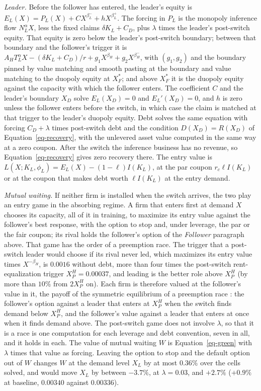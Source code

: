 \documentclass[
  11pt,
  letterpaper,
]{scrartcl}
\begin{document}
\emph{Leader.} Before the follower has entered, the leader's equity is
\(E_L(X) = P_L(X) + C X^{\beta_L^-} + h X^{\beta_L^+}\). The forcing in
\(P_L\) is the monopoly inference flow \(N_L^\alpha X\), less the fixed
claims \(\delta K_L + C_D\), plus \(\lambda\) times the leader's
post-switch equity. That equity is zero below the leader's post-switch
boundary; between that boundary and the follower's trigger it is
\(A_H T_L^\alpha X - (\delta K_L + C_D)/r + g_1 X^{\beta_H} + g_2 X^{\beta_H^-}\),
with \((g_1, g_2)\) and the boundary pinned by value matching and smooth
pasting at the boundary and value matching to the duopoly equity at
\(X_F^*\); and above \(X_F^*\) it is the duopoly equity against the
capacity with which the follower enters. The coefficient \(C\) and the
leader's boundary \(X_D\) solve \(E_L(X_D) = 0\) and \(E_L'(X_D) = 0\),
and \(h\) is zero unless the follower enters before the switch, in which
case the claim is matched at that trigger to the leader's duopoly
equity. Debt solves the same equation with forcing \(C_D + \lambda\)
times post-switch debt and the condition \(D(X_D) = R(X_D)\) of
Equation~\ref{eq-recovery}, with the unlevered asset value computed in
the same way at a zero coupon. After the switch the inference business
has no revenue, so Equation~\ref{eq-recovery} gives zero recovery there.
The entry value is \(L(X; K_L, \phi_L) = E_L(X) - (1-\ell)I(K_L)\), at
the par coupon \(r_c\ell I(K_L)\) or at the coupon that makes debt worth
\(\ell I(K_L)\) at the entry demand.

\emph{Mutual waiting.} If neither firm is installed when the switch
arrives, the two play an entry game in the absorbing regime. A firm that
enters first at demand \(X\) chooses its capacity, all of it in
training, to maximize its entry value against the follower's best
response, with the option to stop and, under leverage, the par or the
fair coupon; its rival holds the follower's option of the
\emph{Follower} paragraph above. That game has the order of a preemption
race. The trigger that a post-switch leader would choose if its rival
never led, which maximizes its entry value times \(X^{-\beta_H}\), is
\(0.0016\) without debt, more than four times the post-switch
rent-equalization trigger \(X_P^H = 0.00037\), and leading is the better
role above \(X_P^H\) (by more than \(10\%\) from \(2X_P^H\) on). Each
firm is therefore valued at the follower's value in it, the payoff of
the symmetric equilibrium of a preemption race
\citep{fudenberg1985preemption}: the follower's option against a leader
that enters at \(X_P^H\) when the switch finds demand below \(X_P^H\),
and the follower's value against a leader that enters at once when it
finds demand above. The post-switch game does not involve \(\lambda\),
so that it is a race is one computation for each leverage and debt
convention, seven in all, and it holds in each. The value of mutual
waiting \(W\) is Equation~\ref{eq-green} with \(\lambda\) times that
value as forcing. Leaving the option to stop and the default option out
of \(W\) changes \(W\) at the demand level \(X_L\) by at most \(0.36\%\)
over the cells solved, and would move \(X_L\) by between \(-3.7\%\), at
\(\lambda = 0.03\), and \(+2.7\%\) (\(+0.9\%\) at baseline, \(0.00340\)
against \(0.00336\)).
\end{document}
